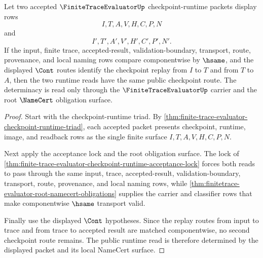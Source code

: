 \begin{theorem}
\label{thm:finitetrace-evaluator-checkpoint-runtime-route-determinacy}
Let two accepted $\FiniteTraceEvaluatorUp$ checkpoint-runtime packets display
rows
$$
I,T,A,V,H,C,P,N
$$
and
$$
I',T',A',V',H',C',P',N'.
$$
If the input, finite trace, accepted-result, validation-boundary, transport,
route, provenance, and local naming rows compare componentwise by $\hsame$,
and the displayed $\Cont$ routes identify the checkpoint replay from $I$ to
$T$ and from $T$ to $A$, then the two runtime reads have the same public
checkpoint route. The determinacy is read only through the
$\FiniteTraceEvaluatorUp$ carrier and the root $\NameCert$ obligation surface.
\end{theorem}
\begin{proof}
Start with the checkpoint-runtime triad. By
\autoref{thm:finite-trace-evaluator-checkpoint-runtime-triad}, each accepted
packet presents checkpoint, runtime, image, and readback rows as the single
finite surface $I,T,A,V,H,C,P,N$.

Next apply the acceptance lock and the root obligation surface. The lock of
\autoref{thm:finite-trace-evaluator-checkpoint-runtime-acceptance-lock} forces
both reads to pass through the same input, trace, accepted-result,
validation-boundary, transport, route, provenance, and local naming rows, while
\autoref{thm:finitetrace-evaluator-root-namecert-obligations} supplies the
carrier and classifier rows that make componentwise $\hsame$ transport valid.

Finally use the displayed $\Cont$ hypotheses. Since the replay routes from
input to trace and from trace to accepted result are matched componentwise, no
second checkpoint route remains. The public runtime read is therefore
determined by the displayed packet and its local NameCert surface.
\end{proof}

